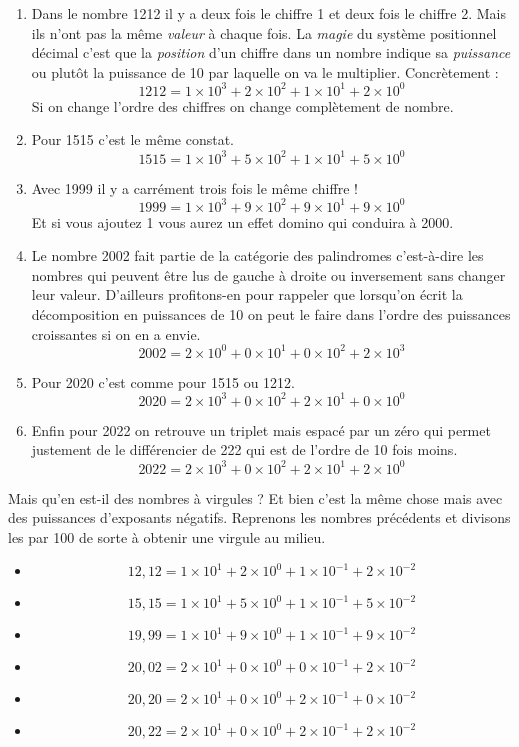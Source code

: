 \documentclass[a4paper,11pt]{book}
\begin{document}
\begin{enumerate}
\item Dans le nombre 1212 il y a deux fois le chiffre 1 et deux fois le
chiffre 2. Mais ils n'ont pas la même \emph{valeur} à chaque fois. La
\emph{magie} du système positionnel décimal c'est que la \emph{position} d'un
chiffre dans un nombre indique sa \emph{puissance} ou plutôt la
puissance de 10 par laquelle on va le multiplier.
Concrètement :
\[1212 = 1\times 10^3 + 2\times 10^2 + 1\times 10^1 + 2\times
   10^0\]
Si on change l'ordre des chiffres on change complètement de nombre.
\item Pour 1515 c'est le même constat.
\[1515 = 1\times 10^3 + 5\times 10^2 + 1\times 10^1 + 5\times 10^0\]
\item Avec 1999 il y a carrément trois fois le même chiffre !
\[1999 = 1\times 10^3 + 9\times 10^2 + 9\times 10^1 + 9\times
   10^0\]
Et si vous ajoutez 1 vous aurez un effet domino qui conduira
à 2000.
\item Le nombre 2002 fait partie de la catégorie des palindromes
c'est-à-dire les nombres qui peuvent être lus de gauche à droite ou
inversement sans changer leur valeur. D'ailleurs profitons-en pour
rappeler que lorsqu'on écrit la décomposition en puissances de 10
on peut le faire dans l'ordre des puissances croissantes si on en a
envie.
\[2002 = 2\times 10^0 + 0\times 10^1 + 0\times 10^2 + 2\times 10^3\]
\item Pour 2020 c'est comme pour 1515 ou 1212.
\[2020 = 2\times 10^3 + 0\times 10^2 + 2\times 10^1 + 0\times 10^0\]
\item Enfin pour 2022 on retrouve un triplet mais espacé par un zéro qui
permet justement de le différencier de 222 qui est de l'ordre de 10
fois moins.
\[2022 = 2\times 10^3 + 0\times 10^2 + 2\times 10^1 + 2\times 10^0\]
\end{enumerate}


Mais qu'en est-il des nombres à virgules ? Et bien c'est la même
chose mais avec des puissances d'exposants négatifs. Reprenons les
nombres précédents et divisons les par 100 de sorte à obtenir une
virgule au milieu.


\begin{itemize}
\item \[12,12 = 1\times 10^1 + 2\times 10^0 + 1\times 10^{-1} + 2\times 10^{-2}\]
\item \[15,15 = 1\times 10^1 + 5\times 10^0 + 1\times 10^{-1} + 5\times 10^{-2}\]
\item \[19,99 = 1\times 10^1 + 9\times 10^0 + 1\times 10^{-1} + 9\times 10^{-2}\]
\item \[20,02 = 2\times 10^1 + 0\times 10^0 + 0\times 10^{-1} + 2\times 10^{-2}\]
\item \[20,20 = 2\times 10^1 + 0\times 10^0 + 2\times 10^{-1} + 0\times 10^{-2}\]
\item \[20,22 = 2\times 10^1 + 0\times 10^0 + 2\times 10^{-1} + 2\times 10^{-2}\]
\end{itemize}
\end{document}
